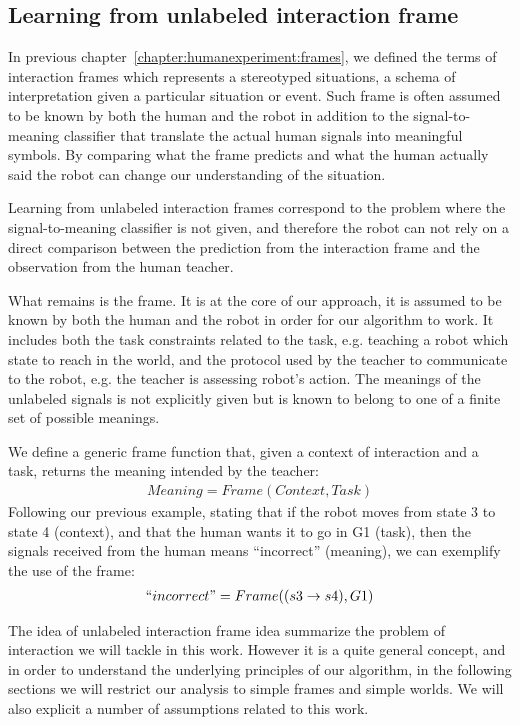 \subsection{Learning from unlabeled interaction frame}

In previous chapter~\ref{chapter:humanexperiment:frames}, we defined the terms of interaction frames which represents a stereotyped situations, a schema of interpretation given a particular situation or event. Such frame is often assumed to be known by both the human and the robot in addition to the signal-to-meaning classifier that translate the actual human signals into meaningful symbols. By comparing what the frame predicts and what the human actually said the robot can change our understanding of the situation.

Learning from unlabeled interaction frames correspond to the problem where the signal-to-meaning classifier is not given, and therefore the robot can not rely on a direct comparison between the prediction from the interaction frame and the observation from the human teacher. 

What remains is the frame. It is at the core of our approach, it is assumed to be known by both the human and the robot in order for our algorithm to work. It includes both the task constraints related to the task, e.g. teaching a robot which state to reach in the world, and the protocol used by the teacher to communicate to the robot, e.g. the teacher is assessing robot's action. The meanings of the unlabeled signals is not explicitly given but is known to belong to one of a finite set of possible meanings.

We define a generic frame function that, given a context of interaction and a task, returns the meaning intended by the teacher:
%
\begin{eqnarray}
Meaning = Frame(Context, Task)
\end{eqnarray}
%
Following our previous example, stating that if the robot moves from state 3 to state 4 (context), and that the human wants it to go in G1 (task), then the signals received from the human means ``incorrect'' (meaning), we can exemplify the use of the frame:
%
\begin{eqnarray}
``incorrect" = Frame((s3 \rightarrow s4), G1)
\end{eqnarray}

\transition

The idea of unlabeled interaction frame idea summarize the problem of interaction we will tackle in this work. However it is a quite general concept, and in order to understand the underlying principles of our algorithm, in the following sections we will restrict our analysis to simple frames and simple worlds. We will also explicit a number of assumptions related to this work.

